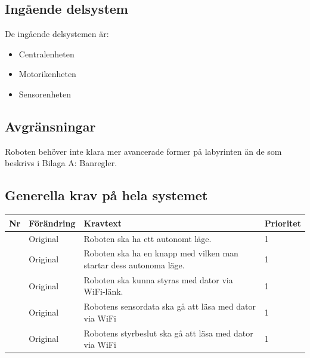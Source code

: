 \documentclass[a4paper,titlepage,12pt]{article}
\newcounter{reqNr}
\newcommand{\nextReqNr}{\stepcounter{reqNr}\arabic{reqNr}}
\begin{document}
	\subsection{Ingående delsystem}
    De ingående delsystemen är:
    
    \begin{itemize}
        \item Centralenheten
        \item Motorikenheten
        \item Sensorenheten
    \end{itemize}
	\subsection{Avgränsningar}
	Roboten behöver inte klara mer avancerade former på labyrinten än de som beskrivs i Bilaga A: Banregler.
	\subsection{Generella krav på hela systemet}

	\begin{table}[h]
		\begin{tabularx}{\textwidth}{|c|l|X|l|}
		\hline
			\textbf{Nr} & \textbf{Förändring} & \textbf{Kravtext} & \textbf{Prioritet} 
				\\ \hline
	
			\nextReqNr & Original & Roboten ska ha ett autonomt läge. & 1
					\\ \hline

			\nextReqNr & Original & Roboten ska ha en knapp med vilken man startar 
				dess autonoma läge. & 1
				\\ \hline

			\nextReqNr & Original & Roboten ska kunna styras med dator 
				via WiFi-länk. & 1
				\\ \hline
		
			\nextReqNr & Original & Robotens sensordata ska gå att läsa 
				med dator via WiFi & 1
				\\ \hline

			\nextReqNr & Original & Robotens styrbeslut ska gå att läsa 
				med dator via WiFi & 1
				\\ \hline
		\end{tabularx}
	\end{table}

\end{document}
